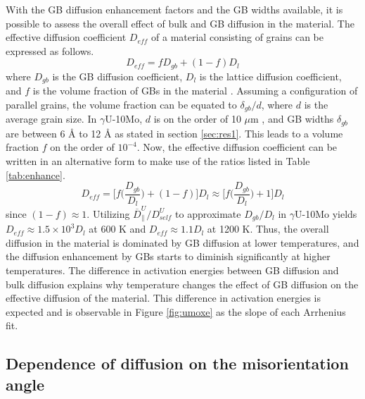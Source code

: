 \documentclass{elsarticle}
\providecommand{\DIFadd}[1]{{\protect\color{blue} \sf #1}} %
\providecommand{\DIFaddbegin}{} %
\providecommand{\DIFaddend}{} %
\begin{document}
\DIFaddbegin \DIFadd{With the GB diffusion enhancement factors and the GB widths available, it is possible to assess the overall effect of bulk and GB diffusion in the material. The effective diffusion coefficient $D_{eff}$ of a material consisting of grains can be expressed as follows.
}\begin{equation}
	D_{eff} = f D_{gb} + (1-f) D_l
\end{equation}
\DIFadd{where $D_{gb}$ is the GB diffusion coefficient, $D_l$ is the lattice diffusion coefficient, and $f$ is the volume fraction of GBs in the material \cite{mishin1997, heitjans2006}. Assuming a configuration of parallel grains, the volume fraction can be equated to $\delta_{gb} / d$, where $d$ is the average grain size. In $\gamma$U-10Mo, $d$ is on the order of 10 $\mu$m \cite{jana2017, di2021}, and GB widths $\delta_{gb}$ are between 6 \r{A} to 12 \r{A} as stated in section \ref{sec:res1}. This leads to a volume fraction $f$ on the order of $10^{-4}$. Now, the effective diffusion coefficient can be written in an alternative form to make use of the ratios listed in Table \ref{tab:enhance}.
}\begin{equation}
	D_{eff} = \bigg[ f \bigg( \frac{D_{gb}}{D_l} \bigg)
		+ (1 - f) \bigg] D_l
	\approx \bigg[ f \bigg( \frac{D_{gb}}{D_l} \bigg) + 1 \bigg] D_l
\end{equation}
\DIFadd{since $(1-f) \approx 1$. Utilizing $\overline{D}^U_{\parallel} / D^U_{self}$ to approximate $D_{gb} / D_l$ in $\gamma$U-10Mo yields $D_{eff} \approx 1.5 \times 10^3 D_l$ at 600 K and $D_{eff} \approx 1.1 D_l$ at 1200 K. Thus, the overall diffusion in the material is dominated by GB diffusion at lower temperatures, and the diffusion enhancement by GBs starts to diminish significantly at higher temperatures. The difference in activation energies between GB diffusion and bulk diffusion explains why temperature changes the effect of GB diffusion on the effective diffusion of the material. This difference in activation energies is expected and is observable in Figure \ref{fig:umoxe} as the slope of each Arrhenius fit.
}


\DIFaddend \FloatBarrier
\subsection{Dependence of diffusion on \DIFaddbegin \DIFadd{the }\DIFaddend misorientation angle}
\end{document}
